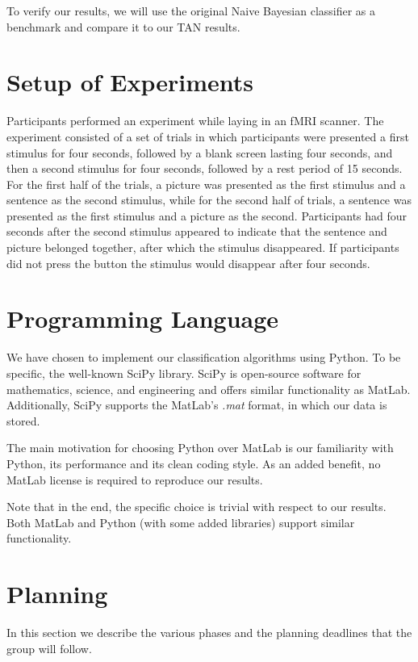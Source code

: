 \documentclass[a4paper, 11pt]{scrartcl}
\begin{document}
To verify our results, we will use the original Naive Bayesian classifier as a benchmark and compare it to our TAN results.

\section{Setup of Experiments}
\label{sec:setup}

Participants performed an experiment while laying in an fMRI scanner. The experiment consisted of a set of trials in which participants were presented a first stimulus for four seconds, followed by a blank screen lasting four seconds, and then a second stimulus for four seconds, followed by a rest period of 15 seconds. For the first half of the trials, a picture was presented as the first stimulus and a sentence as the second stimulus, while for the second half of trials, a sentence was presented as the first stimulus and a picture as the second. Participants had four seconds after the second stimulus appeared to indicate that the sentence and picture belonged together, after which the stimulus disappeared. If participants did not press the button the stimulus would disappear after four seconds.

\section{Programming Language}
\label{sec:language}

We have chosen to implement our classification algorithms using Python. To be specific,  the well-known SciPy library. SciPy is open-source software for mathematics, science, and engineering and offers similar functionality as MatLab. Additionally, SciPy supports the MatLab's \emph{.mat} format, in which our data is stored.

The main motivation for choosing Python over MatLab is our familiarity with Python, its performance and its clean coding style. As an added benefit, no MatLab license is required to reproduce our results.

Note that in the end, the specific choice is trivial with respect to our results. Both MatLab and Python (with some added libraries) support similar functionality.

\section{Planning}
\label{sec:planning}

In this section we describe the various phases and the planning deadlines that the group will follow.
\end{document}
